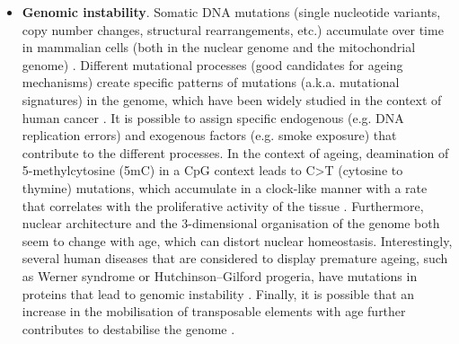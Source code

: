 \begin{itemize}
	
	\item \textbf{Genomic instability}. Somatic DNA mutations (single nucleotide variants, copy number changes, structural rearrangements, etc.) accumulate over time in mammalian cells (both in the nuclear genome and the mitochondrial genome) \cite{Martincorena2018,Larsson2010}. Different mutational processes (good candidates for ageing mechanisms) create specific patterns of mutations (a.k.a. mutational signatures) in the genome, which have been widely studied in the context of human cancer \cite{Alexandrov2014}. It is possible to assign specific endogenous (e.g. DNA replication errors) and exogenous factors (e.g. smoke exposure) that contribute to the different processes. In the context of ageing, deamination of 5-methylcytosine (\acrshort{5mC}) in a \acrshort{CpG} context leads to C>T (cytosine to thymine) mutations, which accumulate in a clock-like manner with a rate that correlates with the proliferative activity of the tissue \cite{Alexandrov2015}. Furthermore, nuclear architecture and the 3-dimensional organisation of the genome both seem to change with age, which can distort nuclear homeostasis. Interestingly, several human diseases that are considered to display premature ageing, such as Werner syndrome or Hutchinson–Gilford progeria, have mutations in proteins that lead to genomic instability \cite{Oberdoerffer2007}. Finally, it is possible that an increase in the mobilisation of transposable elements with age further contributes to destabilise the genome \cite{Orr2016}.
	

\end{itemize}

